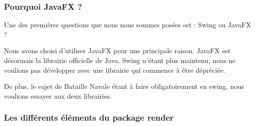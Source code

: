 \subsubsection{Pourquoi JavaFX ?}

Une des premières questions que nous nous sommes posées est : Swing ou JavaFX ?

Nous avons choisi d'utiliser JavaFX pour une principale raison. JavaFX est désormais la librairie officielle de Java. Swing n'étant plus maintenu, nous ne voulions pas développer avec une librairie qui commence à être dépréciée.

De plus, le sujet de Bataille Navale étant à faire obligatoirement en swing, nous voulions essayer aux deux librairies.

\subsubsection{Les différents éléments du package render}
